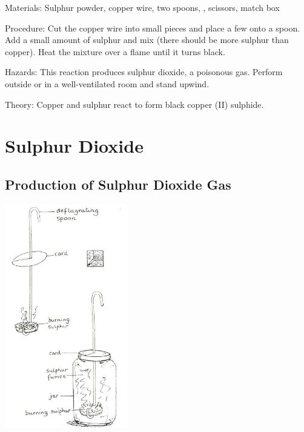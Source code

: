 \begin{multicols}{2}
\begin{description*}
\item[Materials:]{Sulphur powder, copper wire, two spoons, , scissors, match box}
\item[Procedure:]{Cut the copper wire into small pieces and place a few onto a spoon. Add a small amount of sulphur and mix (there should be more sulphur than copper). Heat the mixture over a flame until it turns black.}
\item[Hazards:]{This reaction produces sulphur dioxide, a poisonous gas. Perform outside or in a well-ventilated room and stand upwind.}
\item[Theory:]{Copper and sulphur react to form black copper (II) sulphide.}
\end{description*}

\columnbreak


\section*{Sulphur Dioxide}


\subsection{Production of Sulphur Dioxide Gas} %

\begin{center}
\includegraphics[width=0.4\textwidth]{./img/source/sulphur-dioxide.jpg}
\end{center}


\end{multicols}
